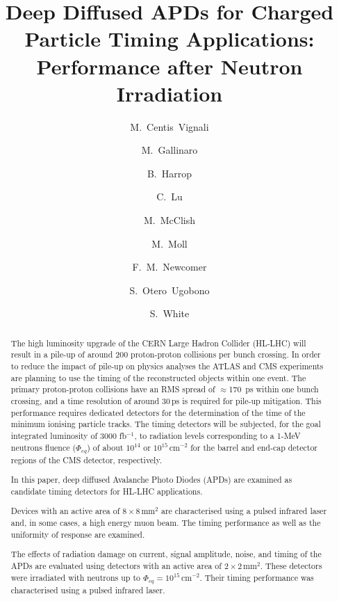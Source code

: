 \documentclass[review,number,sort&compress]{elsarticle}
\begin{document}
\begin{frontmatter}

\title{Deep Diffused APDs for Charged Particle Timing Applications: Performance after Neutron Irradiation}

\author[cern]{M.~Centis~Vignali}

\author[cern,lip]{M.~Gallinaro}
\author[uprinc]{B.~Harrop}
\author[uprinc]{C.~Lu}
\author[rmd]{M.~McClish}
\author[cern]{M.~Moll}
\author[upenn]{F.~M.~Newcomer}
\author[cern,usan]{S.~Otero~Ugobono}
\author[cern,uvirg]{S.~White}

\address[cern]{CERN, Geneva, Switzerland}
\address[lip]{LIP, Lisbon, Portugal}
\address[uprinc]{Princeton University, Princeton, USA}
\address[rmd]{Radiation Monitoring Devices, Watertown, USA}
\address[upenn]{University of Pennsylvania, Philadelphia, USA}
\address[usan]{Universidade de Santiago de Compostela, Santiago de Compostela, Spain}
\address[uvirg]{University of Virginia, Charlottesville, USA}

\begin{abstract}
The high luminosity upgrade of the CERN Large Hadron Collider (HL-LHC) will result in a pile-up of around 200 proton-proton collisions per bunch crossing.
In order to reduce the impact of pile-up on physics analyses the ATLAS and CMS experiments are planning to use the timing of the reconstructed objects within one event.
The primary proton-proton collisions have an RMS spread of $\approx$170~ps within one bunch crossing, and a time resolution of around 30\,ps is required for pile-up mitigation.
This performance requires dedicated detectors for the determination of the time of the minimum ionising particle tracks.
The timing detectors will be subjected, for the goal integrated luminosity of 3000 fb$^{-1}$, to radiation levels corresponding to a 1-MeV neutrons fluence ($\Phi_{eq}$) of about $10^{14}$ or $10^{15}$\,cm$^{-2}$ for the barrel and end-cap detector regions of the CMS detector, respectively.

In this paper, deep diffused Avalanche Photo Diodes (APDs) are examined as candidate timing detectors for HL-LHC applications.

Devices with an active area of $8 \times 8$\,mm$^2$ are characterised using a pulsed infrared laser and, in some cases, a high energy muon beam.
The timing performance as well as the uniformity of response are examined.

The effects of radiation damage on current, signal amplitude, noise, and timing of the APDs are evaluated using detectors with an active area of $2 \times 2$\,mm$^2$.
These detectors were irradiated with neutrons up to $\Phi_{eq} = 10^{15}$\,cm$^{-2}$.
Their timing performance was characterised using a pulsed infrared laser.


\end{abstract}

\end{frontmatter}
\end{document}
